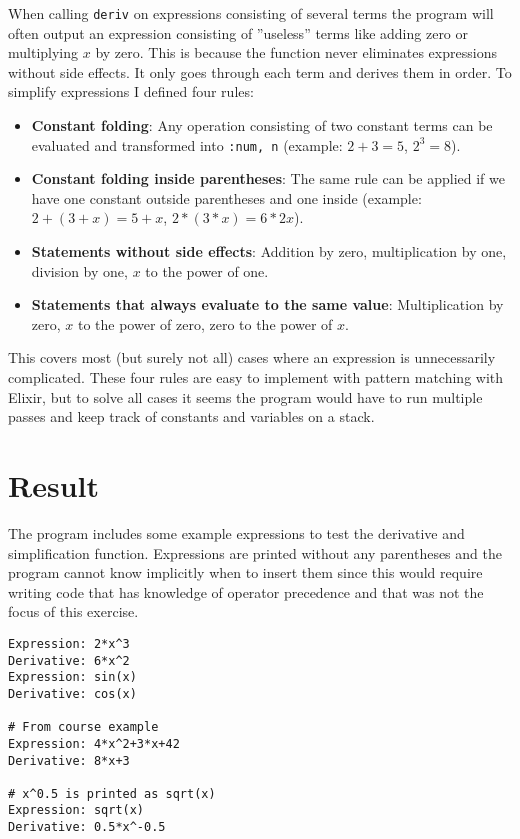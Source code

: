 \documentclass[a4paper,11pt]{article}
\begin{document}
When calling \texttt{deriv} on expressions consisting of several terms the program will often output an expression consisting of ''useless'' terms like adding zero or multiplying $x$ by zero.
This is because the function never eliminates expressions without side effects. It only goes through each term and derives them in order.
To simplify expressions I defined four rules:
\begin{itemize}
	\item \textbf{Constant folding}: Any operation consisting of two constant terms can be evaluated and transformed into \texttt{{:num, n}} (example: $2+3 = 5$, $2^3 = 8$).
	\item \textbf{Constant folding inside parentheses}: The same rule can be applied if we have one constant outside parentheses and one inside (example: $2+(3+x)=5+x$, $2*(3*x) = 6*2x$).
  \item \textbf{Statements without side effects}: Addition by zero, multiplication by one, division by one, $x$ to the power of one.
  \item \textbf{Statements that always evaluate to the same value}: Multiplication by zero, $x$ to the power of zero, zero to the power of $x$.
\end{itemize}

This covers most (but surely not all) cases where an expression is unnecessarily complicated.
These four rules are easy to implement with pattern matching with Elixir,
but to solve all cases it seems the program would have to run multiple passes and keep track of
constants and variables on a stack.

\section*{Result}

The program includes some example expressions to test the derivative and simplification function.
Expressions are printed without any parentheses and the program cannot know implicitly when to insert them
since this would require writing code that has knowledge of operator precedence and that was not the focus of this exercise.

\begin{verbatim}
Expression: 2*x^3
Derivative: 6*x^2
Expression: sin(x)
Derivative: cos(x)

# From course example
Expression: 4*x^2+3*x+42
Derivative: 8*x+3

# x^0.5 is printed as sqrt(x)
Expression: sqrt(x)
Derivative: 0.5*x^-0.5
\end{verbatim}
\end{document}
